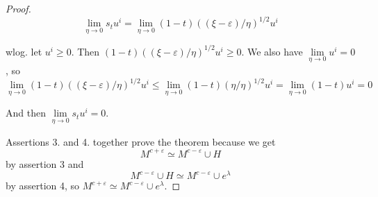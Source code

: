\begin{proof}
   \[ 
      \lim\limits_{\eta \to 0} s_t u^i 
      = \lim\limits_{\eta \to 0} (1 - t)((\xi - \varepsilon)/\eta)^{1/2}u^i
   \]

   wlog. let $u^i \geq 0$. Then $(1 - t)((\xi - \varepsilon)/\eta)^{1/2}u^i \geq 0$.
   We also have $\lim\limits_{\eta \to 0} u^i = 0$, so
   \[ 
      \lim\limits_{\eta \to 0} (1 - t)((\xi - \varepsilon)/\eta)^{1/2}u^i  
      \leq \lim\limits_{\eta \to 0} (1 - t)(\eta/\eta)^{1/2}u^i
      = \lim\limits_{\eta \to 0} (1 - t)u^i = 0
   \]

   And then $\lim\limits_{\eta \to 0} s_t u^i = 0$.
   
   Assertions 3. and 4. together prove the theorem because we get 
   \[ M^{c + \varepsilon} \simeq M^{c-\varepsilon} \cup H \]
   by assertion 3 and
   \[ M^{c-\varepsilon} \cup H \simeq M^{c - \varepsilon} \cup e^{\lambda} \]
   by assertion 4, so $M^{c + \varepsilon} \simeq M^{c - \varepsilon} \cup e^{\lambda}$.
 \end{proof}